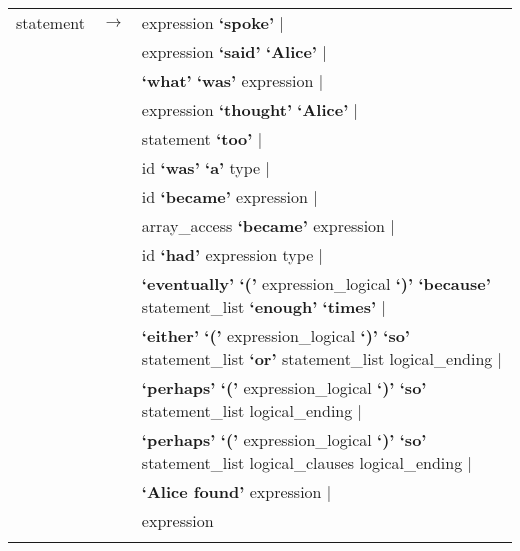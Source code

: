 \documentclass[landscape]{article}
\begin{document}
\begin{longtable}{ l c l}
    statement & \ensuremath{\to} &  expression  \textbf{`spoke'}  | \\
    & &  expression  \textbf{`said'} \textbf{`Alice'}  | \\
    & &  \textbf{`what'} \textbf{`was'} expression   | \\
    & &  expression  \textbf{`thought'} \textbf{`Alice'}  | \\
    & &  statement  \textbf{`too'}  | \\
    & &  id \textbf{`was'} \textbf{`a'} type   | \\
    & &  id \textbf{`became'} expression   | \\
    & &  array\_access  \textbf{`became'} expression   | \\
    & &  id \textbf{`had'} expression  type |\\
    & &  \textbf{`eventually'} \textbf{`('} expression\_logical  \textbf{`)'} \textbf{`because'} statement\_list  \textbf{`enough'} \textbf{`times'}  |\\
    & &  \textbf{`either'} \textbf{`('} expression\_logical  \textbf{`)'} \textbf{`so'} statement\_list  \textbf{`or'} statement\_list logical\_ending | \\
    & &  \textbf{`perhaps'} \textbf{`('} expression\_logical  \textbf{`)'} \textbf{`so'} statement\_list  logical\_ending  | \\
    & &  \textbf{`perhaps'} \textbf{`('} expression\_logical  \textbf{`)'} \textbf{`so'} statement\_list  logical\_clauses logical\_ending |   \\
    & & \textbf{`Alice found'} expression   | \\
    & & expression \\

    \\


\end{longtable}
\end{document}
